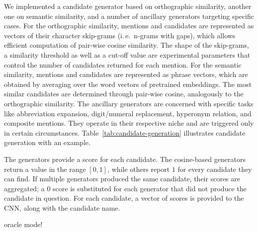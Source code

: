 \documentclass{bioinfo}
\newcommand{\ie}{i.\,e.\ }
\begin{document}
We implemented a candidate generator based on orthographic similarity, another one on semantic similarity, and a number of ancillary generators targeting specific cases.
For the orthographic similarity, mentions and candidates are represented as vectors of their character skip-grams (\ie n-grams with gaps),  %
which allows efficient computation of pair-wise cosine similarity.
The shape of the skip-grams, a similarity threshold as well as a cut-off value are experimental parameters that control the number of candidates returned for each mention.
For the semantic similarity, mentions and candidates are represented as phrase vectors, which are obtained by averaging over the word vectors of pretrained embeddings.
The most similar candidates are determined through pair-wise cosine, analogously to the orthographic similarity.
The ancillary generators are concerned with specific tasks like abbreviation expansion, digit/numeral replacement, hyperonym relation, and composite mentions.
They operate in their respective niche and are triggered only in certain circumstances.
Table~\ref{tab:candidate-generation} illustrates candidate generation with an example.

The generators provide a score for each candidate.
The cosine-based generators return a value in the range $[0,1]$, while others report $1$ for every candidate they can find.
If multiple generators produced the same candidate, their scores are aggregated; a $0$ score is substituted for each generator that did not produce the candidate in question.
For each candidate, a vector of scores is provided to the CNN, along with the candidate name.

oracle mode!
\end{document}
